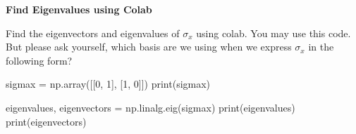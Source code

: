 \documentclass[a4paper, 10pt]{article}
\begin{document}
\subject
{}

\begin{problem}
\textbf{Find Eigenvalues using Colab}
\par Find the eigenvectors and eigenvalues of \( \sigma_x \) using colab.
You may use this code.
But please ask yourself, which basis are we using when we express \( \sigma_x \) in the following form?
\begin{codingbox}
sigmax = np.array([[0, 1], [1, 0]])
print(sigmax)

eigenvalues, eigenvectors = np.linalg.eig(sigmax)
print(eigenvalues)
print(eigenvectors)
\end{codingbox}
\end{problem}
\end{document}
